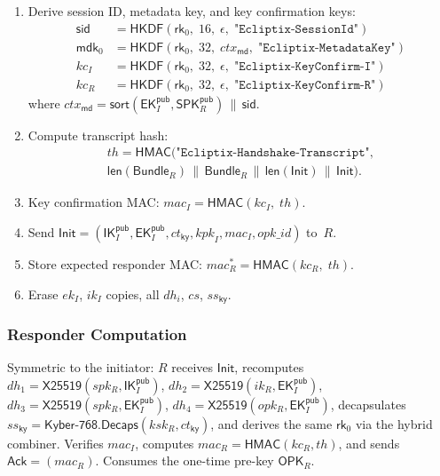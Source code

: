 \documentclass[11pt,a4paper]{article}
\theoremstyle{definition}
\theoremstyle{remark}
\newcommand{\HKDF}{\mathsf{HKDF}}
\newcommand{\HMAC}{\mathsf{HMAC}}
\renewcommand{\DH}{\mathsf{X25519}}
\newcommand{\KEM}{\mathsf{Kyber\text{-}768}}
\newcommand{\Decaps}{\mathsf{Decaps}}
\newcommand{\IK}{\mathsf{IK}}
\newcommand{\SPK}{\mathsf{SPK}}
\newcommand{\EK}{\mathsf{EK}}
\newcommand{\OPK}{\mathsf{OPK}}
\newcommand{\rk}{\mathsf{rk}}
\newcommand{\mdk}{\mathsf{mdk}}
\newcommand{\sid}{\mathsf{sid}}
\newcommand{\concat}{\,\|\,}
\begin{document}
\begin{enumerate}[nosep]
  \item Derive session ID, metadata key, and key confirmation keys:
  \begin{align*}
    \sid &= \HKDF(\rk_0,\; 16,\; \epsilon,\; \texttt{"Ecliptix-SessionId"}) \\
    \mdk_0 &= \HKDF(\rk_0,\; 32,\; \mathit{ctx}_{\mathsf{md}},\; \texttt{"Ecliptix-MetadataKey"}) \\
    \mathit{kc}_I &= \HKDF(\rk_0,\; 32,\; \epsilon,\; \texttt{"Ecliptix-KeyConfirm-I"}) \\
    \mathit{kc}_R &= \HKDF(\rk_0,\; 32,\; \epsilon,\; \texttt{"Ecliptix-KeyConfirm-R"})
  \end{align*}
  where $\mathit{ctx}_{\mathsf{md}} = \mathsf{sort}(\EK_I^{\mathsf{pub}}, \SPK_R^{\mathsf{pub}}) \concat \sid$.
  \item Compute transcript hash:
  \begin{multline*}
    \mathit{th} = \HMAC\bigl(\texttt{"Ecliptix-Handshake-Transcript"},\\
    \mathsf{len}(\mathsf{Bundle}_R) \concat \mathsf{Bundle}_R \concat
    \mathsf{len}(\mathsf{Init}) \concat \mathsf{Init}\bigr).
  \end{multline*}
  \item Key confirmation MAC: $\mathit{mac}_I = \HMAC(\mathit{kc}_I,\; \mathit{th})$.
  \item Send $\mathsf{Init} = (\IK_I^{\mathsf{pub}}, \EK_I^{\mathsf{pub}},
    \mathit{ct}_{\mathsf{ky}}, \mathit{kpk}_I, \mathit{mac}_I, \mathit{opk\_id})$ to~$R$.
  \item Store expected responder MAC: $\mathit{mac}_R^{*} = \HMAC(\mathit{kc}_R,\; \mathit{th})$.
  \item Erase $ek_I$, $ik_I$ copies, all $\mathit{dh}_i$, $\mathit{cs}$, $\mathit{ss}_{\mathsf{ky}}$.
\end{enumerate}

\subsubsection{Responder Computation}

Symmetric to the initiator: $R$ receives $\mathsf{Init}$, recomputes
$\mathit{dh}_1 = \DH(spk_R, \IK_I^{\mathsf{pub}})$,
$\mathit{dh}_2 = \DH(ik_R, \EK_I^{\mathsf{pub}})$,
$\mathit{dh}_3 = \DH(spk_R, \EK_I^{\mathsf{pub}})$,
$\mathit{dh}_4 = \DH(opk_R, \EK_I^{\mathsf{pub}})$,
decapsulates $\mathit{ss}_{\mathsf{ky}} = \KEM.\Decaps(\mathit{ksk}_R, \mathit{ct}_{\mathsf{ky}})$,
and derives the same $\rk_0$ via the hybrid combiner.  Verifies $\mathit{mac}_I$,
computes $\mathit{mac}_R = \HMAC(\mathit{kc}_R, \mathit{th})$, and sends
$\mathsf{Ack} = (\mathit{mac}_R)$.  Consumes the one-time pre-key $\OPK_R$.
\end{document}
